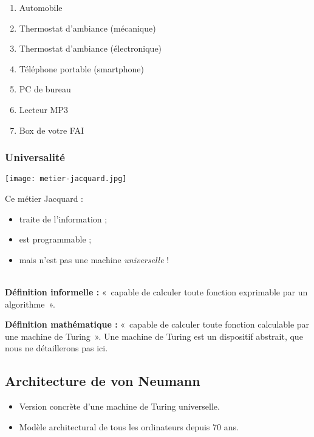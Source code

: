 \begin{multicols}{2}
\begin{enumerate}
\item Automobile
\item Thermostat d'ambiance (mécanique)
\item Thermostat d'ambiance (électronique)
\item Téléphone portable (smartphone)
\item PC de bureau
\item Lecteur MP3
\item Box de votre FAI
\end{enumerate}

\subsubsection*{Universalité}
\begin{center}
\texttt{[image: metier-jacquard.jpg]}
\end{center}
  Ce métier Jacquard :
  \begin{itemize}
  \item traite de l'information ;
  \item est programmable ;
  \item mais n'est pas une machine \emph{universelle} !
  \end{itemize}

\begin{defi}[Universelle] ~\\
\textbf{Définition informelle :} «~capable de calculer toute fonction exprimable par un
algorithme~».

\noindent \textbf{Définition mathématique :} «~capable de calculer toute fonction calculable par
  une machine de Turing~». Une machine de Turing est un dispositif abstrait, que nous ne détaillerons pas ici. 
\end{defi}

\subsection*{Architecture de von Neumann}

\begin{itemize}
\item Version concrète d'une machine de Turing universelle.
\item Modèle architectural de tous les ordinateurs depuis 70 ans.
\end{itemize}


\end{multicols}
